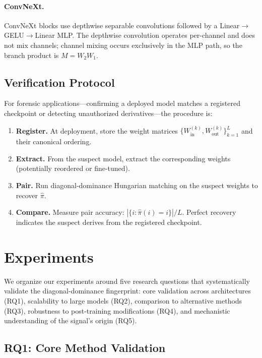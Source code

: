 \documentclass[wcp]{jmlr}
\begin{document}
\paragraph{ConvNeXt.} ConvNeXt blocks use depthwise separable convolutions followed by a Linear$\to$GELU$\to$Linear MLP. The depthwise convolution operates per-channel and does not mix channels; channel mixing occurs exclusively in the MLP path, so the branch product is $M = W_2 W_1$.

\subsection{Verification Protocol}\label{sec:verification}

For forensic applications---confirming a deployed model matches a registered checkpoint or detecting unauthorized derivatives---the procedure is:

\begin{enumerate}[leftmargin=*,itemsep=2pt]
  \item \textbf{Register.} At deployment, store the weight matrices $\{W_{\mathrm{in}}^{(k)}, W_{\mathrm{out}}^{(k)}\}_{k=1}^L$ and their canonical ordering.
  \item \textbf{Extract.} From the suspect model, extract the corresponding weights (potentially reordered or fine-tuned).
  \item \textbf{Pair.} Run diagonal-dominance Hungarian matching on the suspect weights to recover $\hat\pi$.
  \item \textbf{Compare.} Measure pair accuracy: $|\{i : \hat\pi(i) = i\}|/L$. Perfect recovery indicates the suspect derives from the registered checkpoint.
\end{enumerate}

\section{Experiments}\label{sec:experiments}

We organize our experiments around five research questions that systematically validate the diagonal-dominance fingerprint: core validation across architectures (RQ1), scalability to large models (RQ2), comparison to alternative methods (RQ3), robustness to post-training modifications (RQ4), and mechanistic understanding of the signal's origin (RQ5).

\subsection{RQ1: Core Method Validation}
\end{document}
